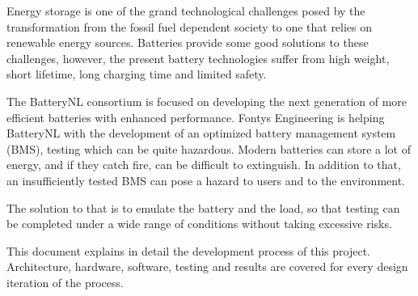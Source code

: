 \IEEEPARstart
{E}{nergy} storage is one of the grand technological challenges posed by the transformation from the
fossil fuel dependent society to one that relies on renewable energy sources. Batteries provide
some good solutions to these challenges, however, the present battery technologies suffer from
high weight, short lifetime, long charging time and limited safety.

The BatteryNL consortium is focused on developing the next generation of more efficient
batteries with enhanced performance. Fontys Engineering is helping BatteryNL with the development 
of an optimized battery management system (BMS), testing which can be quite
hazardous. Modern batteries can store a lot of energy, and if they catch fire, can be difficult to
extinguish. In addition to that, an insufficiently tested BMS can pose a hazard to users and to
the environment.

The solution to that is to emulate the battery and the load, so that testing can be completed
under a wide range of conditions without taking excessive risks.

This document explains in detail the development process of this project. Architecture, hardware, software, testing 
and results are covered for every design iteration of the process. 